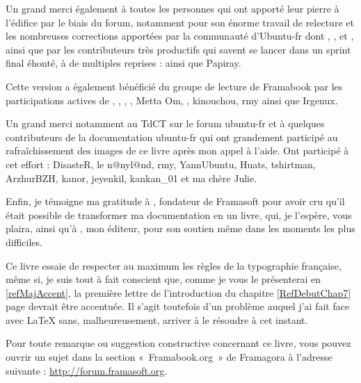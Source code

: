 \begin{Remerciements}
Un grand merci également à toutes les personnes qui ont apporté leur pierre à l'édifice par le biais du forum, notamment  pour son énorme travail de relecture et les nombreuses corrections apportées par la communauté d'Ubuntu-fr dont , ,  et , ainsi que par les contributeurs très productifs qui savent se lancer dans un sprint final éhonté, à de multiples reprises :  ainsi que Papiray.\par
Cette version a également bénéficié du groupe de lecture de Framabook par les participations actives de , , , , Metta Om,  , kinouchou, rmy ainsi que Irgenux.\par
Un grand merci notamment au TdCT sur le forum ubuntu-fr et à quelques contributeurs de la documentation ubuntu-fr qui ont grandement participé au rafraîchissement des images de ce livre après mon appel à l'aide. Ont participé à cet effort : DisasteR, le n@nyl@nd, rmy, YannUbuntu, Huats, tshirtman, ArzhurBZH, kanor, jeyenkil, kankan\_01 et ma chère Julie.\par
Enfin, je témoigne ma gratitude à , fondateur de Framasoft pour avoir cru qu'il était possible de transformer ma documentation en un livre, qui, je l'espère, vous plaira, ainsi qu'à , mon éditeur, pour son soutien même dans les moments les plus difficiles.\par
Ce livre essaie de respecter au maximum les règles de la typographie française, même si, je suis tout à fait conscient que, comme je vous le présenterai en \ref{refMajAccent}, la première lettre de l'introduction du chapitre \ref{RefDebutChap7} page \pageref{RefDebutChap7} devrait être accentuée. Il s'agit toutefois d'un problème auquel j'ai fait face avec \LaTeX{} sans, malheureusement, arriver à le résoudre à cet instant.\par
Pour toute remarque ou suggestion constructive concernant ce livre, vous pouvez ouvrir un sujet dans la section «~Framabook.org~» de Framagora à l'adresse suivante : \url{http://forum.framasoft.org}.\par
\end{Remerciements}
